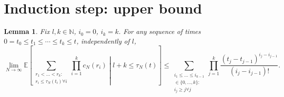 \documentclass{article}
\newtheorem{lemma}{Lemma}
\newcommand{\E}{\mathbb{E}}
\newcommand{\1}[1]{\mathbbm{1}_{#1}}
\begin{document}


\section*{Induction step: upper bound}

\begin{lemma}\label{thm:LOterms_UB}
Fix $l, k \in \mathbb{N}$, $i_0=0$, $i_k=k$. For any sequence of times $0 = t_0 \leq t_1 \leq \cdots \leq t_k \leq t$, independently of $l$,
\begin{equation}
\lim_{N\to\infty} \E \left[ \sum_{\substack{r_1<\dots<r_k :\\ r_i\leq \tau_N(t_i) \forall i}} \prod_{i=1}^k c_N(r_i) \middle| l+k \leq \tau_N(t) \right] 
\leq \sum_{\substack{i_1\leq \dots\leq i_{k-1}\\ \in \{0,\dots,k\} :\\ i_j \geq j \forall j}} \prod_{j=1}^k \frac{(t_j - t_{j-1})^{i_j - i_{j-1}}}{(i_j - i_{j-1})! } .
\end{equation}
\end{lemma}
\end{document}
